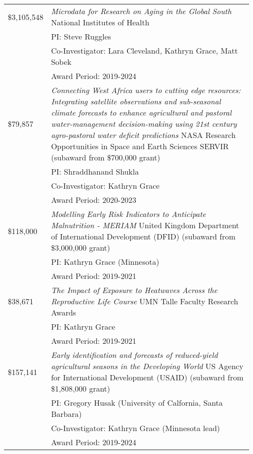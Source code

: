 \documentclass[11pt]{article} %
\begin{document}
\begin{tabular}{lp{11cm}}


\$3,105,548 & \emph{Microdata for Research on Aging in the Global South} National Institutes of Health\\
&PI: Steve Ruggles\\
&Co-Investigator: Lara Cleveland, Kathryn Grace, Matt Sobek\\
&Award Period: 2019-2024\\




\$79,857 & \emph{Connecting West Africa users to cutting edge resources: Integrating satellite observations and sub-seasonal climate forecasts to enhance agricultural and pastoral water-management decision-making using 21st century agro-pastoral water deficit predictions} NASA Research Opportunities in Space and Earth Sciences SERVIR (subaward from \$700,000 grant)\\
&PI: Shraddhanand Shukla\\
&Co-Investigator: Kathryn Grace\\
&Award Period: 2020-2023\\



\$118,000 & \emph{Modelling Early Risk Indicators to Anticipate Malnutrition - MERIAM} United Kingdom Department of International Development (DFID) (subaward from \$3,000,000 grant)\\
&PI: Kathryn Grace (Minnesota)\\
&Award Period: 2019-2021\\




\$38,671 &\emph{The Impact of Exposure to Heatwaves Across the Reproductive Life Course} UMN Talle Faculty Research Awards\\
&PI: Kathryn Grace\\
&Award Period: 2019-2021\\



\$157,141 &\emph{Early identification and forecasts of reduced-yield agricultural seasons in the Developing World} US Agency for International Development (USAID) (subaward from \$1,808,000 grant)\\
&PI: Gregory Husak (University of Calfornia, Santa Barbara)\\
&Co-Investigator: Kathryn Grace (Minnesota lead)\\
&Award Period: 2019-2024\\




\end{tabular}
\end{document}
